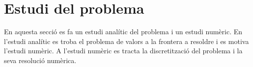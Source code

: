 
\section{Estudi del problema} \label{sec:estudi_del_problema}

En aquesta secció es fa un estudi analític del problema i un estudi numèric. En l'estudi analític es troba el problema de valors a la frontera a resoldre i es motiva l'estudi numèric. A l'estudi numèric es tracta la discretització del problema i la seva resolució numèrica.







